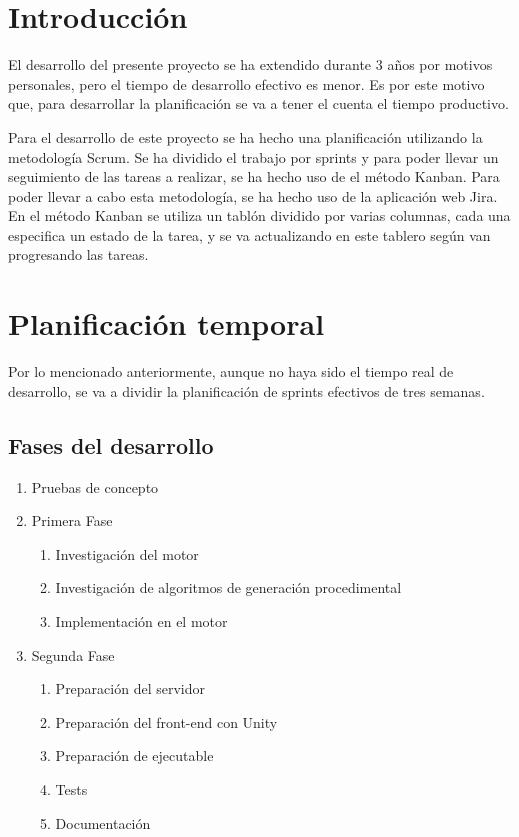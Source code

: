 
\section{Introducción}
El desarrollo del presente proyecto se ha extendido durante 3 años por motivos personales, pero el tiempo de desarrollo efectivo es menor. Es por este motivo que, para desarrollar la planificación se va a tener el cuenta el tiempo productivo.

Para el desarrollo de este proyecto se ha hecho una planificación utilizando la metodología Scrum. Se ha dividido el trabajo por sprints y para poder llevar un seguimiento de las tareas a realizar, se ha hecho uso de el método Kanban. Para poder llevar a cabo esta metodología, se ha hecho uso de la aplicación web Jira. En el método Kanban se utiliza un tablón dividido por varias columnas, cada una especifica un estado de la tarea, y se va actualizando en este tablero según van progresando las tareas.


\section{Planificación temporal}
Por lo mencionado anteriormente, aunque no haya sido el tiempo real de desarrollo, se va a dividir la planificación de sprints efectivos de tres semanas.

\subsection{Fases del desarrollo}

\begin{enumerate}
    \item Pruebas de concepto
    \item Primera Fase
        \begin{enumerate}
            \item Investigación del motor
            \item Investigación de algoritmos de generación procedimental
            \item Implementación en el motor
        \end{enumerate}
    \item Segunda Fase
        \begin{enumerate}
            \item Preparación del servidor
            \item Preparación del front-end con Unity
            \item Preparación de ejecutable
            \item Tests
            \item Documentación
        \end{enumerate}
\end{enumerate}



